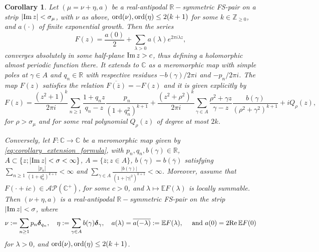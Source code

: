 \documentclass[a4paper,reqno,12pt]{amsart}
\newtheorem{corollary}[theorem]{Corollary}
\newcommand{\A}{\mathcal{A}}
\renewcommand{\P}{\mathcal{P}}
\newcommand{\z}{\mathbb{Z}}
\renewcommand{\r}{\mathbb{R}}
\newcommand{\cp}{\mathbb{C}} %
\newcommand{\bo}{\boldsymbol}
\newcommand{\la}{\lambda}
\newcommand{\ga}{\gamma}
\newcommand{\ord}{{\rm ord}}
\newcommand{\ov}[1]{\overline{#1}}
\newcommand{\cd}{\cdot}
\newcommand{\1}{{\bf 1}}
\newcommand{\e}{\mathbb{E}}
\newcommand{\mt}{\mapsto}
\newcommand{\del}{{\bo \delta}}
\renewcommand{\Re}{{\rm Re}\,}
\renewcommand{\Im}{{\rm Im}\,}
\begin{document}
\begin{corollary}
    \label{corollary_discrete_measure}
    Let $(\mu=\nu+\eta,a)$ be a real-antipodal $\r-$symmetric FS-pair on a strip $|\Im{z}|<\sigma_\mu$, with $\nu$ as above, $\ord(\nu),\ord(\eta)\leq 2(k+1)$ for some $k\in\z_{\geq0}$, and $a(\cd)$ of finite exponential growth. Then the series
    \begin{equation}
    \label{eq:corollary_Fourier_series}
        F(z)=\frac{a(0)}{2}+\sum_{\la>0} a(\la)e^{2\pi i\la z},
    \end{equation}
    converges absolutely in some half-plane $\Im{z}>c$, thus defining a holomorphic almost periodic function there. It extends to $\cp$ as a meromorphic map with simple poles at $\ga\in A$ and $q_n\in\r$ with respective residues $-b(\ga)/2\pi i$ and $-p_n/2\pi i$. The map $F(z)$ satisfies the relation $\ov{F(\ov{z})}=-F(z)$ and it is given explicitly by
    \begin{equation}
    \label{eq:corollary_extension_formula}
        F(z)=\frac{(z^2+1)^k}{2\pi i}\sum_{n\geq1} \frac{1+q_nz}{q_n-z}\frac{p_n}{(1+q_n^2)^{k+1}}+
        \frac{(z^2+\rho^2)^k}{2\pi i}\sum_{\ga\in A} \frac{\rho^2+\ga z}{\ga-z}\frac{b(\ga)}{(\rho^2+\ga^2)^{k+1}}+iQ_\rho(z),
    \end{equation}
    for $\rho>\sigma_\mu$ and for some real polynomial $Q_\rho(z)$ of degree at most $2k$.
    
Conversely, let $F:\cp\rightarrow\cp$ be a meromorphic map given by \eqref{eq:corollary_extension_formula}, with $p_n,q_n,b(\ga)\in\r$, $A\subset\{z;|\Im{z}|<\sigma<\infty\}$, $A=\{\ov{z};z\in A\}$, $b(\ga)=b(\ov{\ga})$ satisfying $\sum_{n\geq1} \frac{|p_n|}{(1+q_n^2)^{k+1}}<\infty$ and $\sum_{\ga\in A} \frac{|b(\ga)|}{(1+|\ga|^2)^{k+1}}<\infty$. Moreover, assume that $F(\cd+ic)\in\A\P(\cp^+)$, for some $c>0$, and $\la\mt\e F(\la)$ is locally summable. Then $(\nu+\eta,a)$ is a real-antipodal $\r-$symmetric FS-pair on the strip $|\Im{z}|<\sigma$, where
 \begin{align*}
     \nu:=\sum_{n\geq1} p_n\del_{q_n},\quad \eta:=\sum_{\ga\in A} b(\ga)\del_\ga,\quad a(\la)=\ov{a(-\la)}:=\e F(\la),\quad \text{ and } a(0)=2\Re{\e F(0)}
 \end{align*}
for $\la>0$, and $\ord(\nu),\ord(\eta)\leq 2(k+1)$.
\end{corollary}
\end{document}
